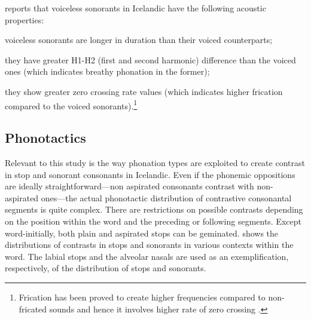 \documentclass[11pt,a4paper,openany]{memoir}\usepackage[]{graphicx}\usepackage[]{color}
\begin{document}
\citet{bombien2006} reports that voiceless sonorants in Icelandic have the following acoustic properties: 
\begin{inparaenum}[(i)]
\item voiceless sonorants are longer in duration than their voiced counterparts;
\item they have greater H1-H2 (first and second harmonic) difference than the voiced ones (which indicates breathy phonation in the former);
\item they show greater zero crossing rate values (which indicates higher frication compared to the voiced sonorants).\footnote{Frication has been proved to create higher frequencies compared to non-fricated sounds and hence it involves higher rate of zero crossing \citep{weigelt1990}.}
\end{inparaenum}

\subsection{Phonotactics}


Relevant to this study is the way phonation types are exploited to create contrast in stop and sonorant consonants in Icelandic.
Even if the phonemic oppositions are ideally straightforward---non aspirated consonants contrast with non-aspirated ones---the actual phonotactic distribution of contrastive consonantal segments is quite complex.
There are restrictions on possible contrasts depending on the position within the word and the preceding or following segments. Except word-initially, both plain and aspirated stops can be geminated.
 shows the distributions of contrasts in stops and sonorants in various contexts within the word.
The labial stops and the alveolar nasals are used as an exemplification, respectively, of the distribution of stops and sonorants.
\end{document}
